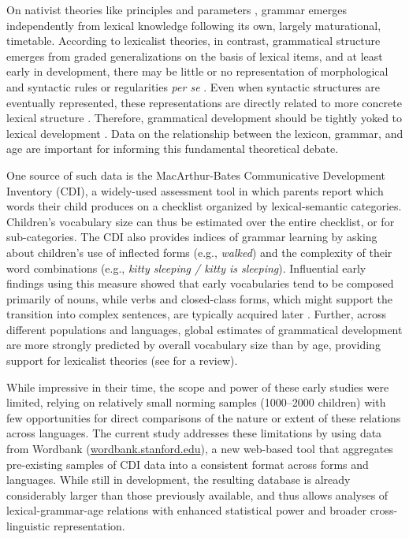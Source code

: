 \documentclass[10pt,letterpaper]{article}
\begin{document}
On nativist theories like principles and parameters \cite{chomsky1981, baker2005}, grammar emerges independently from lexical knowledge following its own, largely maturational, timetable. According to lexicalist theories, in contrast, grammatical structure emerges from graded generalizations on the basis of lexical items, and at least early in development, there may be little or no representation of morphological and syntactic rules or regularities \emph{per se} \cite{tomasello2003}. Even when syntactic structures are eventually represented, these representations are directly related to more concrete lexical structure \cite{bannard2009}. Therefore, grammatical development should be tightly yoked to lexical development \cite{bates1999}. Data on the relationship between the lexicon, grammar, and age are important for informing this fundamental theoretical debate. 


One source of such data is the MacArthur-Bates Communicative Development Inventory (CDI), a widely-used assessment tool in which parents report which words their child produces on a checklist organized by lexical-semantic categories. Children's vocabulary size can thus be estimated over the entire checklist, or for sub-categories. The CDI also provides indices of grammar learning by asking about children's use of inflected forms (e.g., \emph{walked}) and the complexity of their word combinations (e.g., \emph{kitty sleeping / kitty is sleeping}). Influential early findings using this measure showed that early vocabularies tend to be composed primarily of nouns, while verbs and closed-class forms, which might support the transition into complex sentences, are typically acquired later \cite{bates1994}. Further, across different populations and languages, global estimates of grammatical development are more strongly predicted by overall vocabulary size than by age, providing support for lexicalist theories (see  for a review).


While impressive in their time, the scope and power of these early studies were limited, relying on relatively small norming samples (1000--2000 children) with few opportunities for direct comparisons of the nature or extent of these relations across languages. The current study addresses these limitations by using data from Wordbank (\url{wordbank.stanford.edu}), a new web-based tool that aggregates pre-existing samples of CDI data into a consistent format across forms and languages. While still in development, the resulting database is already considerably larger than those previously available, and thus allows analyses of lexical-grammar-age relations with enhanced statistical power and broader cross-linguistic representation. 
\end{document}
